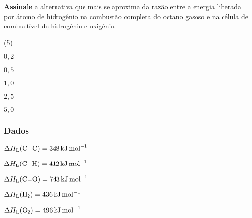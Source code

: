 \documentclass[braun, twocolumn]{braun}
\begin{document}
\begin{problem}
[2A18]\textbf{Assinale} a alternativa que mais se aproxima da razão entre a
energia liberada por átomo de hidrogênio na combustão completa do octano
gasoso e na célula de combustível de hidrogênio e oxigênio.


\begin{choices}
(5)
\item \(0,2\)

\item \(0,5\)

\item \(1,0\)

\item \(2,5\)

\item \(5,0\)

\end{choices}
\subsubsection*{Dados}


\begin{datalist}

\item $\Delta H_\text{L}(\ce{C-C}) = \qty{348}{kJ.mol^{-1}}$
\item $\Delta H_\text{L}(\ce{C-H}) = \qty{412}{kJ.mol^{-1}}$
\item $\Delta H_\text{L}(\ce{C=O}) = \qty{743}{kJ.mol^{-1}}$
\item $\Delta H_\text{L}(\ce{H2}) = \qty{436}{kJ.mol^{-1}}$
\item $\Delta H_\text{L}(\ce{O2}) = \qty{496}{kJ.mol^{-1}}$
\end{datalist}

\end{problem}
\end{document}
